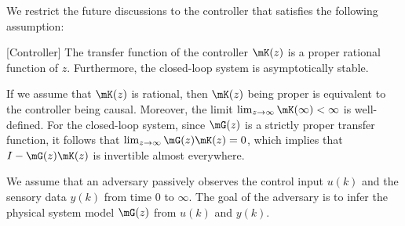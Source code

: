 
We restrict the future discussions to the controller that satisfies the following assumption:
\begin{myass}\label{ass:wp}[Controller]
  The transfer function of the controller $\mK(z)$ is a proper rational function of $z$. Furthermore, the closed-loop system is asymptotically stable.
\end{myass}
\begin{remark}
  If we assume that $\mK(z)$ is rational, then $\mK(z)$ being proper is equivalent to the controller being causal. Moreover, the limit $\lim_{z\rightarrow\infty}\mK(\infty)<\infty$ is well-defined. For the closed-loop system, since $\mG(z)$ is a strictly proper transfer function, it follows that $\lim_{z\rightarrow\infty} \mG(z)\mK(z) = 0$, which implies that $I-\mG(z)\mK(z)$ is invertible almost everywhere.
\end{remark}

We assume that an adversary passively observes the control input $u(k)$ and the sensory data $y(k)$ from time $0$ to $\infty$. The goal of the adversary is to infer the physical system model $\mG(z)$ from $u(k)$ and $y(k)$.